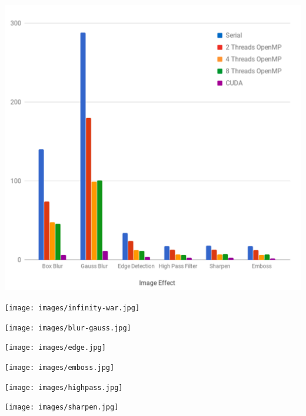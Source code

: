 \documentclass[conference]{IEEEtran}
\begin{document}
\includegraphics[width=\linewidth]{images/conv_graph.png}

\newpage

\texttt{[image: images/infinity-war.jpg]}


\texttt{[image: images/blur-gauss.jpg]}

\texttt{[image: images/edge.jpg]}

\texttt{[image: images/emboss.jpg]}

\texttt{[image: images/highpass.jpg]}

\texttt{[image: images/sharpen.jpg]}


%
%
\end{document}
